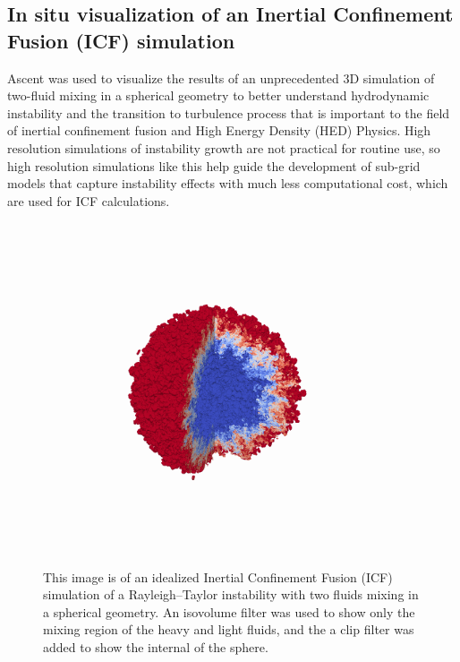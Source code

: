 \subsection{In situ visualization of an Inertial Confinement Fusion (ICF) simulation}

Ascent was used to visualize the results of an unprecedented 3D simulation
of two-fluid mixing in a spherical geometry to better understand hydrodynamic
instability and the transition to turbulence process that is important to
the field of inertial confinement fusion and High Energy Density (HED)
Physics. High resolution simulations of instability growth are not practical
for routine use, so high resolution simulations like this help guide the
development of sub-grid models that capture instability effects with much
less computational cost, which are used for ICF calculations.

\begin{figure}
\centering
\includegraphics[trim={ 0 8cm 0 7cm},width=0.9\textwidth]{images/mixing_ball}
\caption{\label{img:icf}
This image is of an idealized Inertial Confinement
Fusion (ICF) simulation of a Rayleigh–Taylor instability
with two fluids mixing in a spherical geometry.
An isovolume filter was used to show only the mixing region of the heavy and
light fluids, and the a clip filter was added to show the internal of the sphere.
}
\end{figure}

